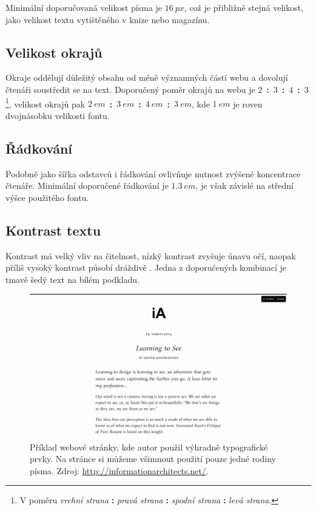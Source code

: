 Minimální doporučovaná velikost písma je $16~px$, což je přibližně stejná velikost, jako velikost textu vytištěného v knize nebo magazínu. \cite{13} \cite{10}

\subsection{Velikost okrajů}

Okraje oddělují důležitý obsahu od méně významných částí webu a dovolují čtenáři soustředit se na text. Doporučený poměr okrajů na webu je $2$~\textbf{:}~$3$~\textbf{:}~$4$~\textbf{:}~$3$\footnote{V poměru \textit{vrchní strana} \textbf{:} \textit{pravá strana} \textbf{:} \textit{spodní strana} \textbf{:} \textit{levá strana}.}, velikost okrajů pak $2~em$~\textbf{:}~$3~em$~\textbf{:}~$4~em$~\textbf{:}~$3~em$, kde $1~em$ je roven dvojnásobku velikosti fontu. \cite{10}

\subsection{Řádkování}

Podobně jako šířka odstavců i řádkování ovlivňuje nutnost zvýšené koncentrace čtenáře. Minimální doporučené řádkování je $1.3~em$, je však závislé na střední výšce použitého fontu.

\subsection{Kontrast textu}

Kontrast má velký vliv na čitelnost, nízký kontrast zvyšuje únavu očí, naopak příliš vysoký kontrast působí dráždivě \cite{11}. Jedna z doporučených kombinací je tmavě šedý text na bílém podkladu.

\begin{figure}[htbp]
    \centering
    \includegraphics[width=\textwidth]{images/typography.png}
    \caption{Příklad webové stránky, kde autor použil výhradně typografické prvky. Na stránce si můžeme všimnout použití pouze jedné rodiny písma. Zdroj: \url{http://informationarchitects.net/}.}
    \label{fig:web-typography}
\end{figure}
